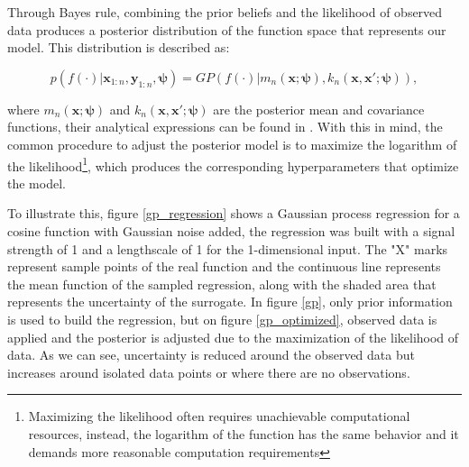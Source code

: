 \documentclass{article}
\begin{document}
Through Bayes rule, combining the prior beliefs and the likelihood of observed data produces a posterior distribution of the function space that represents our model. This distribution is described as\cite{Pandita2016}:

\begin{equation}
    p(f(\cdot)|\textbf{x}_{1:n},\textbf{y}_{1:n},\boldsymbol{\psi}) = GP(f(\cdot)|m_n(\textbf{x};\boldsymbol{\psi}),k_n(\textbf{x},\textbf{x}';\boldsymbol{\psi})),
\end{equation}

where $m_n(\textbf{x};\boldsymbol{\psi})$ and $k_n(\textbf{x},\textbf{x}';\boldsymbol{\psi})$ are the posterior mean and covariance functions, their analytical expressions can be found in \cite{Pandita2016}. With this in mind, the common procedure to adjust the posterior model is to maximize the logarithm of the likelihood\footnote{Maximizing the likelihood often requires unachievable computational resources, instead, the logarithm of the function has the same behavior and it demands more reasonable computation requirements}, which produces the corresponding hyperparameters that optimize the model.

To illustrate this, figure \ref{gp_regression} shows a Gaussian process regression for a cosine function with Gaussian noise added, the regression was built with a signal strength of 1 and a lengthscale of 1 for the 1-dimensional input. The "X" marks represent sample points of the real function and the continuous line represents the mean function of the sampled regression, along with the shaded area that represents the uncertainty of the surrogate. In figure \ref{gp}, only prior information is used to build the regression, but on figure \ref{gp_optimized}, observed data is applied and the posterior is adjusted due to the maximization of the likelihood of data. As we can see, uncertainty is reduced around the observed data but increases around isolated data points or where there are no observations.
\end{document}
